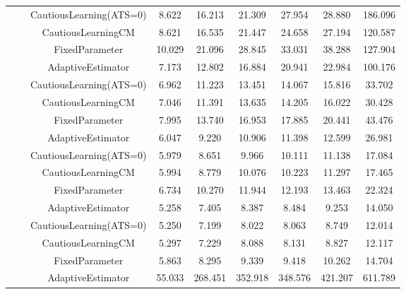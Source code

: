 \begin{table}[!h]
\begin{tabular}[t]{ccccccccc}
 &  & CautiousLearning(ATS=0) & 8.622 & 16.213 & 21.309 & 27.954 & 28.880 & 186.096\\

 &  & CautiousLearningCM & 8.621 & 16.535 & 21.447 & 24.658 & 27.194 & 120.587\\

 & \multirow[t]{-4}{*}{\centering\arraybackslash 0.75} & FixedParameter & 10.029 & 21.096 & 28.845 & 33.031 & 38.288 & 127.904\\
\cmidrule{2-9}
 &  & AdaptiveEstimator & 7.173 & 12.802 & 16.884 & 20.941 & 22.984 & 100.176\\

 &  & CautiousLearning(ATS=0) & 6.962 & 11.223 & 13.451 & 14.067 & 15.816 & 33.702\\

 &  & CautiousLearningCM & 7.046 & 11.391 & 13.635 & 14.205 & 16.022 & 30.428\\

 & \multirow[t]{-4}{*}{\centering\arraybackslash 1.00} & FixedParameter & 7.995 & 13.740 & 16.953 & 17.885 & 20.441 & 43.476\\
\cmidrule{2-9}
 &  & AdaptiveEstimator & 6.047 & 9.220 & 10.906 & 11.398 & 12.599 & 26.981\\

 &  & CautiousLearning(ATS=0) & 5.979 & 8.651 & 9.966 & 10.111 & 11.138 & 17.084\\

 &  & CautiousLearningCM & 5.994 & 8.779 & 10.076 & 10.223 & 11.297 & 17.465\\

 & \multirow[t]{-4}{*}{\centering\arraybackslash 1.25} & FixedParameter & 6.734 & 10.270 & 11.944 & 12.193 & 13.463 & 22.324\\
\cmidrule{2-9}
 &  & AdaptiveEstimator & 5.258 & 7.405 & 8.387 & 8.484 & 9.253 & 14.050\\

 &  & CautiousLearning(ATS=0) & 5.250 & 7.199 & 8.022 & 8.063 & 8.749 & 12.014\\

 &  & CautiousLearningCM & 5.297 & 7.229 & 8.088 & 8.131 & 8.827 & 12.117\\

\multirow[t]{-28}{*}{\centering\arraybackslash 1} & \multirow[t]{-4}{*}{\centering\arraybackslash 1.50} & FixedParameter & 5.863 & 8.295 & 9.339 & 9.418 & 10.262 & 14.704\\
\cmidrule{1-9}
 &  & AdaptiveEstimator & 55.033 & 268.451 & 352.918 & 348.576 & 421.207 & 611.789\\


\end{tabular}
\end{table}

